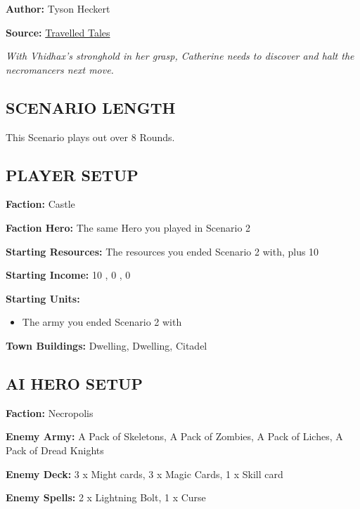 
\begin{multicols*}{2}

\textbf{Author:} Tyson Heckert

\textbf{Source:} \href{https://travelledtales.com}{Travelled Tales}

\textit{With Vhidhax's stronghold in her grasp, Catherine needs to discover and halt the necromancers next move.}

\subsection*{\MakeUppercase{Scenario length}}

This Scenario plays out over 8 Rounds.

\subsection*{\MakeUppercase{Player setup}}

\textbf{Faction:} Castle

\textbf{Faction Hero:} The same Hero you played in Scenario 2

\textbf{Starting Resources:} The resources you ended Scenario 2 with, plus 10 

\textbf{Starting Income:} 10 , 0 , 0 

\textbf{Starting Units:}
\begin{itemize}
  \item The army you ended Scenario 2 with
\end{itemize}

\textbf{Town Buildings:}  Dwelling,  Dwelling, Citadel

\subsection*{\MakeUppercase{AI Hero setup}}

\textbf{Faction:} Necropolis

\textbf{Enemy Army:} A Pack of Skeletons, A Pack of Zombies, A Pack of Liches, A Pack of Dread Knights

\textbf{Enemy Deck:} 3 x Might cards, 3 x Magic Cards, 1 x Skill card

\textbf{Enemy Spells:} 2 x Lightning Bolt, 1 x Curse


\end{multicols*}
